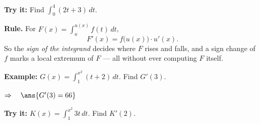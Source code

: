 \documentclass[12pt]{article}
\begin{document}
\begin{tryitbox}
\textbf{Try it:} \quad Find $\displaystyle\int_0^4 (2t + 3)\,dt$.\\[2pt]
\end{tryitbox}


\begin{formulabox}
\textbf{Rule.} For $\displaystyle F(x) = \int_a^{u(x)} f(t)\,dt$,
\[ F'(x) = f\big(u(x)\big)\cdot u'(x). \]
So the \emph{sign of the integrand} decides where $F$ rises and falls, and a
sign change of $f$ marks a local extremum of $F$ --- all without ever computing
$F$ itself.
\end{formulabox}

\begin{examplebox}
\textbf{Example:} \quad $\displaystyle G(x) = \int_1^{x^2}(t + 2)\,dt$. Find
$G'(3)$.

$\Rightarrow\quad \ans{G'(3) = 66}$
\end{examplebox}

\begin{tryitbox}
\textbf{Try it:} \quad $\displaystyle K(x) = \int_1^{x^2} 3t\,dt$. Find $K'(2)$.\\[2pt]
\end{tryitbox}
\end{document}
